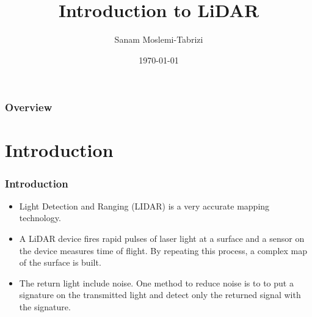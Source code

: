 \documentclass{beamer}
\title[LiDAR]{Introduction to LiDAR} %
\author{Sanam Moslemi-Tabrizi} %
\institute[] %
{
Carleton University \\ %
\medskip
\textit{smoslemi@yahoo.ca} %
}
\date{\today} %
\begin{document}
\begin{frame}
\titlepage %
\end{frame}

\begin{frame}
\frametitle{Overview} %
\tableofcontents %
\end{frame}


\section{Introduction} %
\begin{frame}
\frametitle{Introduction}
\begin{itemize}
\item Light Detection and Ranging (LIDAR) is a very accurate mapping technology.
\item A LiDAR device fires rapid pulses of laser light at a surface and a sensor on the device measures time of flight. By repeating this process, a complex map of the surface is built. 
\item The return light include noise. One method to reduce noise is to to put a signature on the transmitted light and detect only the returned signal with the signature.
\end{itemize}
\end{frame}
%
\end{document}
